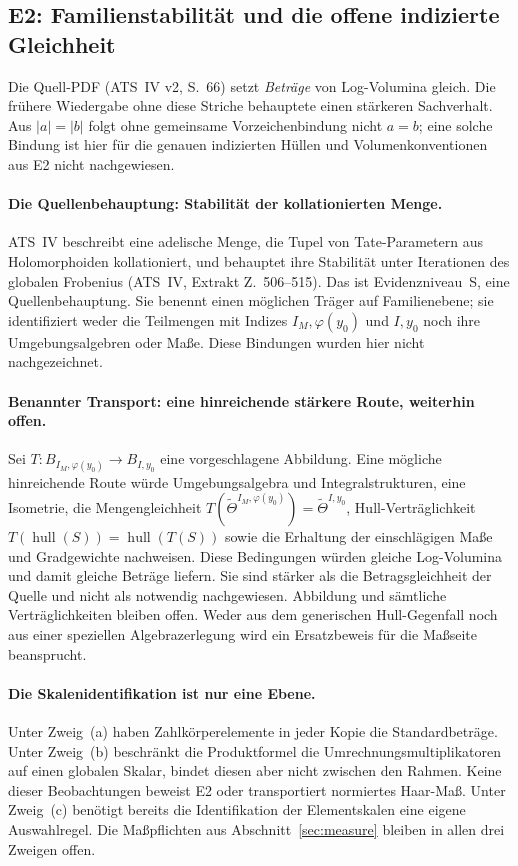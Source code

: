 \documentclass[11pt,a4paper]{article}
\theoremstyle{definition}
\theoremstyle{plain}
\theoremstyle{definition}
\newcommand{\anchor}[2]{(#1, Extrakt Z.~#2)}
\begin{document}
\subsection{E2: Familienstabilität und die offene indizierte Gleichheit}
Die Quell-PDF (ATS~IV v2, S.~66) setzt \emph{Beträge} von Log-Volumina
gleich. Die frühere Wiedergabe ohne diese Striche behauptete einen stärkeren
Sachverhalt. Aus $|a|=|b|$ folgt ohne gemeinsame Vorzeichenbindung nicht
$a=b$; eine solche Bindung ist hier für die genauen indizierten Hüllen
und Volumenkonventionen aus E2 nicht nachgewiesen.

\paragraph{Die Quellenbehauptung: Stabilität der kollationierten Menge.}
ATS~IV beschreibt eine adelische Menge, die Tupel von Tate-Parametern aus
Holomorphoiden kollationiert, und behauptet ihre Stabilität unter Iterationen
des globalen Frobenius \anchor{ATS~IV}{506--515}. Das ist Evidenzniveau~S,
eine Quellenbehauptung. Sie benennt einen möglichen Träger auf Familienebene;
sie identifiziert weder die Teilmengen mit Indizes $I_M,\varphi(y_0)$
und $I,y_0$ noch ihre Umgebungsalgebren oder Maße.
Diese Bindungen wurden hier nicht nachgezeichnet.

\paragraph{Benannter Transport: eine hinreichende stärkere Route, weiterhin offen.}
Sei $T:B_{I_M,\varphi(y_0)}\longrightarrow B_{I,y_0}$ eine vorgeschlagene
Abbildung. Eine mögliche hinreichende Route würde Umgebungsalgebra und
Integralstrukturen, eine Isometrie, die Mengengleichheit
$T(\widetilde\Theta^{I_M,\varphi(y_0)})=\widetilde\Theta^{I,y_0}$,
Hull-Verträglichkeit
$T(\operatorname{hull}(S))=\operatorname{hull}(T(S))$
sowie die Erhaltung der einschlägigen Maße und Gradgewichte nachweisen.
Diese Bedingungen würden gleiche Log-Volumina und damit gleiche Beträge
liefern. Sie sind stärker als die Betragsgleichheit der Quelle und nicht als
notwendig nachgewiesen. Abbildung und sämtliche Verträglichkeiten bleiben
offen. Weder aus dem generischen Hull-Gegenfall noch aus einer speziellen
Algebrazerlegung wird ein Ersatzbeweis für die Maßseite beansprucht.

\paragraph{Die Skalenidentifikation ist nur eine Ebene.}
Unter Zweig~(a) haben Zahlkörperelemente in jeder Kopie die Standardbeträge.
Unter Zweig~(b) beschränkt die Produktformel die Umrechnungsmultiplikatoren
auf einen globalen Skalar, bindet diesen aber nicht zwischen den Rahmen.
Keine dieser Beobachtungen beweist E2 oder transportiert normiertes Haar-Maß.
Unter Zweig~(c) benötigt bereits die Identifikation der Elementskalen eine
eigene Auswahlregel. Die Maßpflichten aus Abschnitt~\ref{sec:measure}
bleiben in allen drei Zweigen offen.
\end{document}
